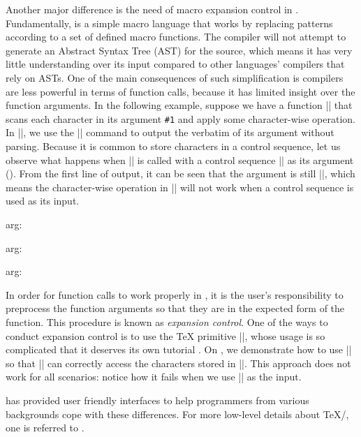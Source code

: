 \documentclass{ltugboat}
\begin{document}
Another major difference is the need of macro expansion control in \LT{}.
Fundamentally, \LT{} is a simple macro language that works by replacing patterns according to a set of defined macro functions.
The \LT{} compiler will not attempt to generate an Abstract Syntax Tree (AST) for the \LT{} source, which means it has very little understanding over its input compared to other languages' compilers that rely on ASTs.
One of the main consequences of such simplification is \LT{} compilers are less powerful in terms of function calls, because it has limited insight over the function arguments.
In the following example, suppose we have a function \inltex|\cmda| that scans each character in its argument \verb|#1| and apply some character-wise operation. 
In \inltex|\cmda|, we use the \inltex|\detokenize| command to output the verbatim of its argument without parsing.
Because it is common to store characters in a control sequence, let us observe what happens when \inltex|\cmda| is called with a control sequence \inltex|\vala| as its argument ().
From the first line of output, it can be seen that the argument is still \inltex|\vala|, which means the character-wise operation in \inltex|\cmda| will not work when a control sequence is used as its input.
\begin{latexsample*}
\def\cmda#1{%
  arg: \detokenize{#1} %
}
\def\vala{val-a}
\def\valb{\vala}
\par\cmda{\vala}
\par\expandafter\expandafter\expandafter\cmda\expandafter{\vala}
\par\expandafter\expandafter\expandafter\cmda\expandafter{\valb}
\end{latexsample*}
\noindent In order for function calls to work properly in \LT{}, it is the user's responsibility to preprocess the function arguments so that they are in the expected form of the function.
This procedure is known as \emph{expansion control}.
One of the ways to conduct expansion control is to use the \TeX{} primitive \inltex|\expandafter|, whose usage is so complicated that it deserves its own tutorial \cite{bechtolsheim1988tutorial}.
On , we demonstrate how to use \inltex|\expandafter| so that \inltex|\cmda| can correctly access the characters stored in \inltex|\vala|.
This approach does not work for all scenarios: notice how it fails when we use \inltex|\valb| as the input.

\LTT{} has provided user friendly interfaces to help \LT{} programmers from various backgrounds cope with these differences.
For more low-level details about \TeX{}/\LT{}, one is referred to \cite{knuth1984texbook,berry2017latex}.
\end{document}
